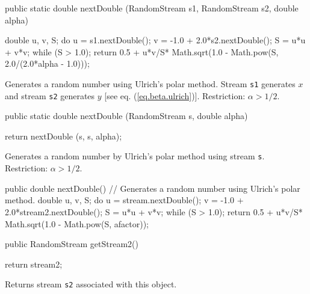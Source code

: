 \begin{code}

   public static double nextDouble (RandomStream s1, RandomStream s2,
                                    double alpha) \begin{hide}  {
      double u, v, S;
      do {
         u = s1.nextDouble();
         v = -1.0 + 2.0*s2.nextDouble();
         S = u*u + v*v;
      } while (S > 1.0);
      return 0.5 + u*v/S* Math.sqrt(1.0 - Math.pow(S, 2.0/(2.0*alpha - 1.0)));
   }\end{hide}
\end{code}
  \begin{tabb} Generates a random number using Ulrich's polar method. Stream
  \texttt{s1} generates $x$ and stream \texttt{s2}  generates $y$
   [see eq. (\ref{eq.beta.ulrich})].
  Restriction:  $\alpha > 1/2$.
  \end{tabb}
\begin{code}

   public static double nextDouble (RandomStream s, double alpha) \begin{hide}  {
      return nextDouble (s, s, alpha);
   }\end{hide}
\end{code}
  \begin{tabb} Generates a random number by Ulrich's polar method using
  stream \texttt{s}.  Restriction:  $\alpha > 1/2$.
  \end{tabb}
\begin{code} \begin{hide}

   public double nextDouble() {
      // Generates a random number using Ulrich's polar method.
      double u, v, S;
      do {
         u = stream.nextDouble();
         v = -1.0 + 2.0*stream2.nextDouble();
         S = u*u + v*v;
      } while (S > 1.0);
      return 0.5 + u*v/S* Math.sqrt(1.0 - Math.pow(S, afactor));
  }\end{hide}

   public RandomStream getStream2()\begin{hide} {
      return stream2;
   }\end{hide}
\end{code}
\begin{tabb}   Returns stream \texttt{s2} associated with this object.
\end{tabb}
\begin{code}\begin{hide}
}
\end{hide}
\end{code}
